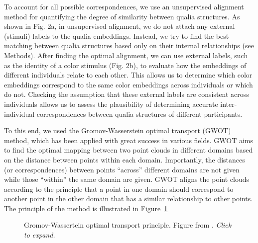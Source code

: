 \documentclass[
  authoryear]{elsarticle}
\begin{document}
To account for all possible correspondences, we use an unsupervised
alignment method for quantifying the degree of similarity between qualia
structures. As shown in Fig. 2a, in unsupervised alignment, we do not
attach any external (stimuli) labels to the qualia embeddings. Instead,
we try to find the best matching between qualia structures based only on
their internal relationships (see Methods). After finding the optimal
alignment, we can use external labels, such as the identity of a color
stimulus (Fig. 2b), to evaluate how the embeddings of different
individuals relate to each other. This allows us to determine which
color embeddings correspond to the same color embeddings across
individuals or which do not. Checking the assumption that these external
labels are consistent across individuals allows us to assess the
plausibility of determining accurate inter-individual correspondences
between qualia structures of different participants.

To this end, we used the Gromov-Wasserstein optimal transport (GWOT)
method, which has been applied with great success in various fields.
GWOT aims to find the optimal mapping between two point clouds in
different domains based on the distance between points within each
domain. Importantly, the distances (or correspondences) between points
``across'' different domains are not given while those ``within'' the
same domain are given. GWOT aligns the point clouds according to the
principle that a point in one domain should correspond to another point
in the other domain that has a similar relationship to other points. The
principle of the method is illustrated in Figure~\ref{fig-gwot-kawa}

\begin{figure}


\caption{\label{fig-gwot-kawa}Gromov-Wassertein optimal transport
principle. Figure from \citet{kawakita2023}. \emph{Click to expand.}}

\end{figure}%
\end{document}
